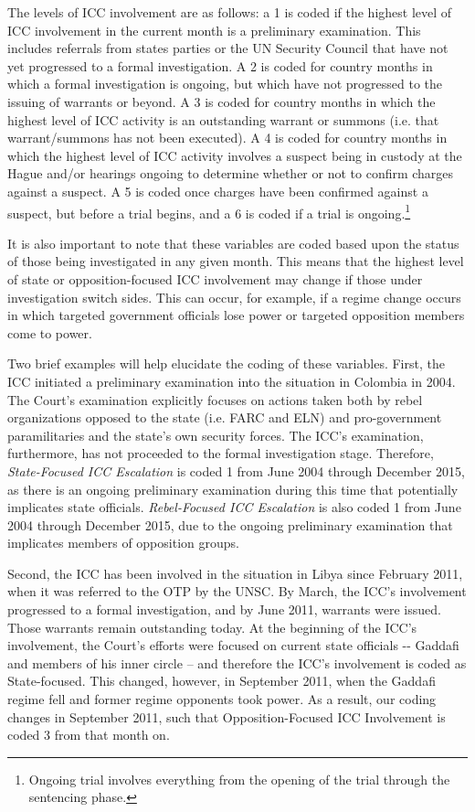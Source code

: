The levels of ICC involvement are as follows: a 1 is coded if the highest level of ICC involvement in the current month is a preliminary examination. This includes referrals from states parties or the UN Security Council that have not yet progressed to a formal investigation. A 2 is coded for country months in which a formal investigation is ongoing, but which have not progressed to the issuing of warrants or beyond. A 3 is coded for country months in which the highest level of ICC activity is an outstanding warrant or summons (i.e. that warrant/summons has not been executed). A 4 is coded for country months in which the highest level of ICC activity involves a suspect being in custody at the Hague and/or hearings ongoing to determine whether or not to confirm charges against a suspect. A 5 is coded once charges have been confirmed against a suspect, but before a trial begins, and a 6 is coded if a trial is ongoing.\footnote{Ongoing trial involves everything from the opening of the trial through the sentencing phase.}

It is also important to note that these variables are coded based upon the status of those being investigated in any given month. This means that the highest level of state or opposition-focused ICC involvement may change if those under investigation switch sides. This can occur, for example, if a regime change occurs in which targeted government officials lose power or targeted opposition members come to power.

Two brief examples will help elucidate the coding of these variables. First, the ICC initiated a preliminary examination into the situation in Colombia in 2004. The Court's examination explicitly focuses on actions taken both by rebel organizations opposed to the state (i.e. FARC and ELN) and pro-government paramilitaries and the state's own security forces. The ICC's examination, furthermore, has not proceeded to the formal investigation stage. Therefore, \emph{State-Focused ICC Escalation} is coded 1 from June 2004 through December 2015, as there is an ongoing preliminary examination during this time that potentially implicates state officials. \emph{Rebel-Focused ICC Escalation} is also coded 1 from June 2004 through December 2015, due to the ongoing preliminary examination that implicates members of opposition groups.

Second, the ICC has been involved in the situation in Libya since February 2011, when it was referred to the OTP by the UNSC. By March, the ICC's involvement progressed to a formal investigation, and by June 2011, warrants were issued. Those warrants remain outstanding today. At the beginning of the ICC's involvement, the Court's efforts were focused on current state officials -\/- Gaddafi and members of his inner circle -- and therefore the ICC's involvement is coded as State-focused. This changed, however, in September 2011, when the Gaddafi regime fell and former regime opponents took power. As a result, our coding changes in September 2011, such that Opposition-Focused ICC Involvement is coded 3 from that month on.

